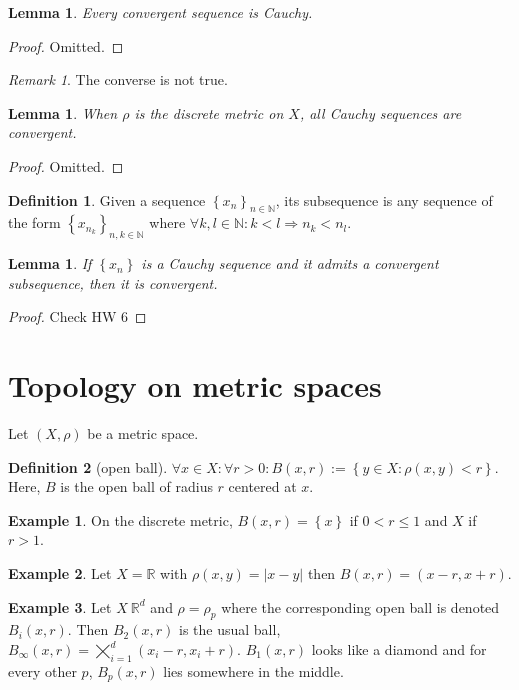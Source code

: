 \documentclass{article}
\newcommand\N{\ensuremath{\mathbb{N}}}
\newcommand\R{\ensuremath{\mathbb{R}}}
\newtheorem{lemma}[theorem]{Lemma}
\theoremstyle{definition}
\newtheorem{definition}{Definition}[subsection]
\newtheorem{eg}{Example}[subsection]
\theoremstyle{remark}
\newtheorem*{remark}{Remark}
\theoremstyle{plain}
\begin{document}
\begin{lemma}
    Every convergent sequence is Cauchy. 
\end{lemma}
\begin{proof}
    Omitted. 
\end{proof}
\begin{remark}
    The converse is not true. 
\end{remark}

\begin{lemma}
    When \(\rho\) is the discrete metric on \(X\), all Cauchy sequences are convergent. 
\end{lemma}
\begin{proof}
    Omitted. 
\end{proof}

\begin{definition}
    Given a sequence \(\left\{ x_n \right\}_{n \in \N}\), its subsequence is any sequence of the form \(\left\{ x_{n_k} \right\}_{n,k \in \N}\) where 
    \(\forall k,l \in \N: k < l \Rightarrow n_k < n_l\).
\end{definition}

\begin{lemma}
    If \(\left\{ x_n \right\}\) is a Cauchy sequence and it admits a convergent subsequence, then it is convergent. 
\end{lemma}
\begin{proof}
    Check HW 6
\end{proof}

\section{Topology on metric spaces}

Let \((X,\rho)\) be a metric space. 

\begin{definition}[open ball]
    \(\forall x \in X: \forall r > 0: B(x,r):=\left\{ y \in X: \rho(x,y) < r \right\}\). Here, \(B\) is the open ball of radius \(r\) centered at \(x\).
\end{definition}

\begin{eg}
    On the discrete metric, \(B(x,r) = \left\{ x \right\}\) if \( 0 < r \leq 1\) and \(X\) if \(r > 1\).
\end{eg}
\begin{eg}
    Let \(X = \R\) with \(\rho(x,y) = |x-y|\) then \(B(x,r) = (x-r, x+r)\).
\end{eg}
\begin{eg}
    Let \(X \ \R^d\) and \(\rho = \rho_p\) where the corresponding open ball is denoted \(B_i(x,r)\). Then \(B_2(x,r)\) is the usual ball, \(B_{\infty}(x,r) = \bigtimes\limits_{i = 1}^d (x_i - r, x_i + r)\). 
    \(B_1(x,r)\) looks like a diamond and for every other \(p\), \(B_p(x,r)\) lies somewhere in the middle.
\end{eg}
\end{document}
